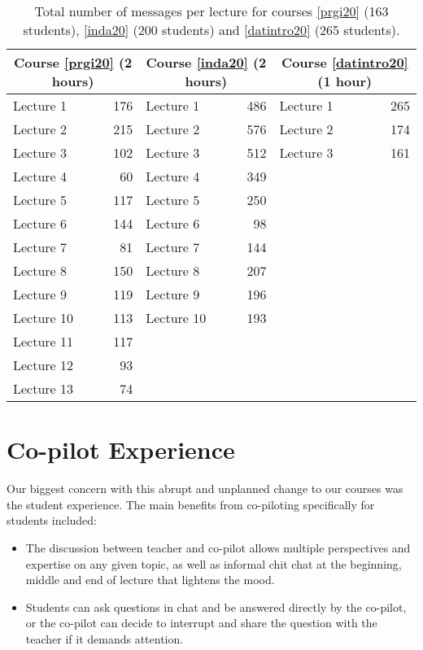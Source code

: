\documentclass[sigconf,natbib=false]{acmart}
\begin{document}
\begin{table}
    \centering
    \begin{tabular}{lr lr lr}
        \toprule
        \multicolumn{2}{c}{Course \ref{prgi20} (2 hours)} &
        \multicolumn{2}{c}{Course \ref{inda20} (2 hours)} &
        \multicolumn{2}{c}{Course \ref{datintro20} (1 hour)} \\
        \midrule
        Lecture 1 & 176 & Lecture 1 & 486 & Lecture 1 & 265 \\
        Lecture 2 & 215 & Lecture 2 & 576 & Lecture 2 & 174 \\
        Lecture 3 & 102 & Lecture 3 & 512 & Lecture 3 & 161 \\
        Lecture 4 & 60 & Lecture 4 & 349 \\
        Lecture 5 & 117 & Lecture 5 & 250 \\
        Lecture 6 & 144 & Lecture 6 & 98 \\
        Lecture 7 & 81 & Lecture 7 & 144 \\
        Lecture 8 & 150 & Lecture 8 & 207 \\
        Lecture 9 & 119 & Lecture 9 & 196 \\
        Lecture 10 & 113 & Lecture 10 & 193 \\
        Lecture 11 & 117 \\
        Lecture 12 & 93 \\
        Lecture 13 & 74 \\
        \bottomrule
    \end{tabular}
    \caption{Total number of messages per lecture for courses \ref{prgi20} (163 students), \ref{inda20} (200 students) and \ref{datintro20} (265 students).}
    \label{MessageDist}
\end{table}

\section{Co-pilot Experience}

Our biggest concern with this abrupt and unplanned change to our courses was the student experience. The main benefits from co-piloting specifically for students included:

\begin{itemize}
  \item The discussion between teacher and co-pilot allows multiple 
    perspectives and expertise on any given topic, as well as informal chit 
    chat at the beginning, middle and end of lecture that lightens the mood.

  \item Students can ask questions in chat and be answered directly by the co-pilot, or the co-pilot can decide to interrupt and share the question with the teacher if it demands attention.
\end{itemize}
\end{document}
